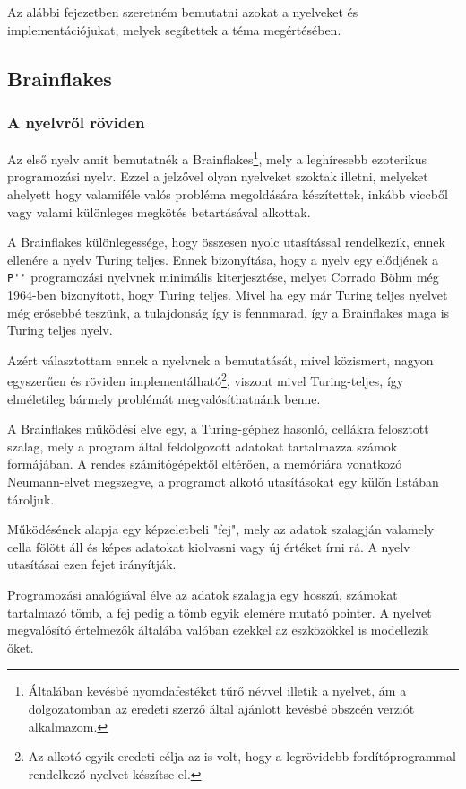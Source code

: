 Az alábbi fejezetben szeretném bemutatni azokat a nyelveket és implementációjukat, melyek segítettek a téma megértésében.

\subsection{Brainflakes}

\subsubsection{A nyelvről röviden}

Az első nyelv amit bemutatnék a Brainflakes\cite{bf}\footnote{Általában kevésbé nyomdafestéket tűrő névvel illetik a nyelvet, ám a dolgozatomban az eredeti szerző által ajánlott kevésbé obszcén verziót alkalmazom.}, mely a leghíresebb ezoterikus programozási nyelv. Ezzel a jelzővel olyan nyelveket szoktak illetni, melyeket ahelyett hogy valamiféle valós probléma megoldására készítettek, inkább viccből vagy valami különleges megkötés betartásával alkottak.

A Brainflakes különlegessége, hogy összesen nyolc utasítással rendelkezik, ennek ellenére a nyelv Turing teljes. Ennek bizonyítása, hogy a nyelv egy elődjének a \verb|P''| programozási nyelvnek minimális kiterjesztése, melyet Corrado Böhm még 1964-ben bizonyított\cite{plang}, hogy Turing teljes. Mivel ha egy már Turing teljes nyelvet még erősebbé teszünk, a tulajdonság így is fennmarad, így a Brainflakes maga is Turing teljes nyelv.

Azért választottam ennek a nyelvnek a bemutatását, mivel közismert, nagyon egyszerűen és röviden implementálható\footnote{Az alkotó egyik eredeti célja az is volt, hogy a legrövidebb fordítóprogrammal rendelkező nyelvet készítse el.\cite{bf}}, viszont mivel Turing-teljes, így elméletileg bármely problémát megvalósíthatnánk benne.

A Brainflakes működési elve egy, a Turing-géphez hasonló, cellákra felosztott szalag, mely a program által feldolgozott adatokat tartalmazza számok formájában. A rendes számítógépektől eltérően, a memóriára vonatkozó Neumann-elvet megszegve, a programot alkotó utasításokat egy külön listában tároljuk.

Működésének alapja egy képzeletbeli "fej", mely az adatok szalagján valamely cella fölött áll és képes adatokat kiolvasni vagy új értéket írni rá. A nyelv utasításai ezen fejet irányítják.

Programozási analógiával élve az adatok szalagja egy hosszú, számokat tartalmazó tömb, a fej pedig a tömb egyik elemére mutató pointer. A nyelvet megvalósító értelmezők általába valóban ezekkel az eszközökkel is modellezik őket.

